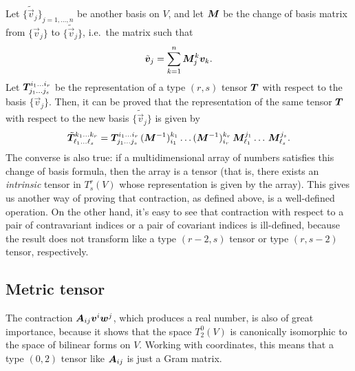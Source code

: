 Let $\{\tilde{\vec{v}}_j\}_{j = 1,\dots,n}$ be another basis on $V$,
and let $\bm{M}$ be the change of basis matrix from $\{\vec{v}_j\}$
to $\{\tilde{\vec{v}}_j\}$, i.e.\ the matrix such that
\[
\tilde{\bm{v}}_j = \sum_{k=1}^n \bm{M}^k_j \bm{v}_k.
\]
Let $\bm{T}^{i_1 \dots i_r}_{j_1 \dots j_s}$ be the representation
of a type $(r,s)$ tensor $\bm{T}$ with respect to the basis $\{\vec{v}_j\}$.
Then, it can be proved that the representation of the same tensor $\bm{T}$
with respect to the new basis $\{\tilde{\vec{v}}_j\}$ is given by
\begin{equation} \label{eq:tensor-change-of-basis}
\tilde{\bm{T}}^{k_1 \dots k_r}_{\ell_1 \dots \ell_s}
= \bm{T}^{i_1 \dots i_r}_{j_1 \dots j_s} \,
(\bm{M}^{-1})_{i_1}^{k_1} \dots (\bm{M}^{-1})_{i_r}^{k_r} \,
\bm{M}^{j_1}_{\ell_1} \dots \, \bm{M}^{j_s}_{\ell_s}.
\end{equation}
The converse is also true: if a multidimensional array of numbers
satisfies this change of basis formula, then the array is a tensor
(that is, there exists an \emph{intrinsic} tensor in $T^r_s(V)$ whose
representation is given by the array). This gives us another way of proving
that contraction, as defined above, is a well-defined operation.
On the other hand, it's easy to see that contraction with respect
to a pair of contravariant indices or a pair of covariant indices is
ill-defined, because the result does not transform like a type $(r-2,s)$
tensor or type $(r,s-2)$ tensor, respectively.

\subsection*{Metric tensor}

The contraction $\bm{A}_{ij} \bm{v}^i \bm{w}^j$, which produces
a real number, is also of great importance, because it shows
that the space $T^0_2(V)$ is canonically isomorphic to
the space of bilinear forms on $V$. Working with coordinates, this means
that a type $(0,2)$ tensor like $\bm{A}_{ij}$ is just a Gram matrix.

